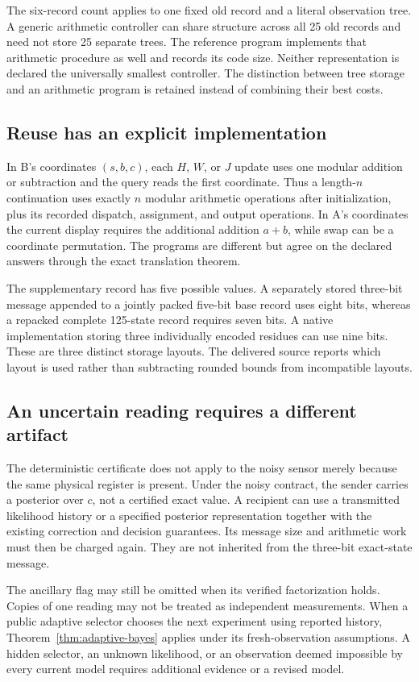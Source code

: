 \documentclass[11pt,letterpaper]{article}
\theoremstyle{plain}
\theoremstyle{definition}
\begin{document}
The six-record count applies to one fixed old record and a literal observation tree. A generic arithmetic controller can share structure across all 25 old records and need not store 25 separate trees. The reference program implements that arithmetic procedure as well and records its code size. Neither representation is declared the universally smallest controller. The distinction between tree storage and an arithmetic program is retained instead of combining their best costs.

\subsection{Reuse has an explicit implementation}
In B's coordinates $(s,b,c)$, each $H$, $W$, or $J$ update uses one modular addition or subtraction and the query reads the first coordinate. Thus a length-$n$ continuation uses exactly $n$ modular arithmetic operations after initialization, plus its recorded dispatch, assignment, and output operations. In A's coordinates the current display requires the additional addition $a+b$, while swap can be a coordinate permutation. The programs are different but agree on the declared answers through the exact translation theorem.

The supplementary record has five possible values. A separately stored three-bit message appended to a jointly packed five-bit base record uses eight bits, whereas a repacked complete 125-state record requires seven bits. A native implementation storing three individually encoded residues can use nine bits. These are three distinct storage layouts. The delivered source reports which layout is used rather than subtracting rounded bounds from incompatible layouts.

\subsection{An uncertain reading requires a different artifact}
The deterministic certificate does not apply to the noisy sensor merely because the same physical register is present. Under the noisy contract, the sender carries a posterior over $c$, not a certified exact value. A recipient can use a transmitted likelihood history or a specified posterior representation together with the existing correction and decision guarantees. Its message size and arithmetic work must then be charged again. They are not inherited from the three-bit exact-state message.

The ancillary flag may still be omitted when its verified factorization holds. Copies of one reading may not be treated as independent measurements. When a public adaptive selector chooses the next experiment using reported history, Theorem~\ref{thm:adaptive-bayes} applies under its fresh-observation assumptions. A hidden selector, an unknown likelihood, or an observation deemed impossible by every current model requires additional evidence or a revised model.
\end{document}
